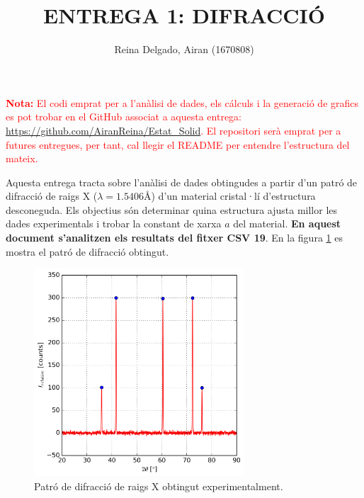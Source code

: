 \documentclass[a4paper, 11pt]{article}
\title{{\textbf{\Large ENTREGA 1: DIFRACCIÓ
}\\}}
\author{Reina Delgado, Airan (1670808)\\}
\date{}
\begin{document}
\maketitle


\noindent \textcolor{red}{\textbf{Nota:} El codi emprat per a l'anàlisi de dades, els cálculs i la generació de grafics es pot trobar en el GitHub associat a aquesta entrega: \url{https://github.com/AiranReina/Estat_Solid}. El repositori serà emprat per a futures entregues, per tant, cal llegir el README per entendre l'estructura del mateix.}

\vspace{5mm}

\noindent Aquesta entrega tracta sobre l'anàlisi de dades obtingudes a partir d'un patró de difracció de raigs X ($\lambda = 1.5406 \text{\AA}$) d'un material cristal·lí d'estructura desconeguda. Els objectius són determinar quina estructura ajusta millor les dades experimentals i trobar la constant de xarxa $a$ del material. \textbf{En aquest document s'analitzen els resultats del fitxer CSV 19}. En la figura \ref{fig:patro} es mostra el patró de difracció obtingut.

\begin{figure}[h!]
    \centering
    \includegraphics[width=0.7\textwidth]{images/grafic_experimental_peaks.png}
    \caption{Patró de difracció de raigs X obtingut experimentalment.}
    \label{fig:patro}
\end{figure}
\end{document}
